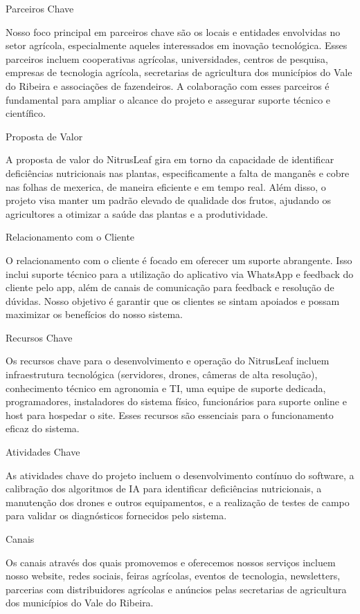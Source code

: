 \documentclass[
  a4paper,%
  12pt,%
  english,%
  brazilian,%
]{article}
\begin{document}
Parceiros Chave

Nosso foco principal em parceiros chave são os locais e entidades envolvidas no setor agrícola, especialmente aqueles interessados em inovação tecnológica. Esses parceiros incluem cooperativas agrícolas, universidades, centros de pesquisa, empresas de tecnologia agrícola, secretarias de agricultura dos municípios do Vale do Ribeira e associações de fazendeiros. A colaboração com esses parceiros é fundamental para ampliar o alcance do projeto e assegurar suporte técnico e científico.

Proposta de Valor

A proposta de valor do NitrusLeaf gira em torno da capacidade de identificar deficiências nutricionais nas plantas, especificamente a falta de manganês e cobre nas folhas de mexerica, de maneira eficiente e em tempo real. Além disso, o projeto visa manter um padrão elevado de qualidade dos frutos, ajudando os agricultores a otimizar a saúde das plantas e a produtividade.

Relacionamento com o Cliente

O relacionamento com o cliente é focado em oferecer um suporte abrangente. Isso inclui suporte técnico para a utilização do aplicativo via WhatsApp e feedback do cliente pelo app, além de canais de comunicação para feedback e resolução de dúvidas. Nosso objetivo é garantir que os clientes se sintam apoiados e possam maximizar os benefícios do nosso sistema.

Recursos Chave

Os recursos chave para o desenvolvimento e operação do NitrusLeaf incluem infraestrutura tecnológica (servidores, drones, câmeras de alta resolução), conhecimento técnico em agronomia e TI, uma equipe de suporte dedicada, programadores, instaladores do sistema físico, funcionários para suporte online e host para hospedar o site. Esses recursos são essenciais para o funcionamento eficaz do sistema.

Atividades Chave

As atividades chave do projeto incluem o desenvolvimento contínuo do software, a calibração dos algoritmos de IA para identificar deficiências nutricionais, a manutenção dos drones e outros equipamentos, e a realização de testes de campo para validar os diagnósticos fornecidos pelo sistema.

Canais

Os canais através dos quais promovemos e oferecemos nossos serviços incluem nosso website, redes sociais, feiras agrícolas, eventos de tecnologia, newsletters, parcerias com distribuidores agrícolas e anúncios pelas secretarias de agricultura dos municípios do Vale do Ribeira.
\end{document}
